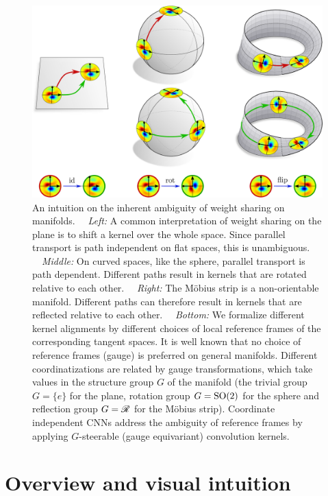

\newpage


\begin{figure}
    \centering
    \includegraphics[width=.93\columnwidth]{figures/intro_transport_ambiguity.pdf}
    \caption{\small
        An intuition on the inherent ambiguity of weight sharing on manifolds.
        \ \ \emph{Left:}
        A common interpretation of weight sharing on the plane is to shift a kernel over the whole space.
        Since parallel transport is path independent on flat spaces, this is unambiguous.
        \ \ \emph{Middle:}
        On curved spaces, like the sphere, parallel transport is path dependent.
        Different paths result in kernels that are rotated relative to each other.
        \ \ \emph{Right:}
        The M\"obius strip is a non-orientable manifold.
        Different paths can therefore result in kernels that are reflected relative to each other.
        \ \ \emph{Bottom:}
        We formalize different kernel alignments by different choices of local reference frames of the corresponding tangent spaces.
        It is well known that no choice of reference frames (gauge) is preferred on general manifolds.
        Different coordinatizations are related by gauge transformations, which take values in the structure group $G$ of the manifold (the trivial group $G=\{e\}$ for the plane, rotation group $G=\operatorname{SO}(2)$ for the sphere and reflection group $G = \mathscr{R}$ for the M\"obius strip).
        Coordinate independent CNNs address the ambiguity of reference frames by applying $G$-steerable (gauge equivariant) convolution kernels.
    }
    \label{fig:weight_sharing_ambiguity}
\end{figure}


\section{Overview and visual intuition}
\label{sec:visual_intro}


